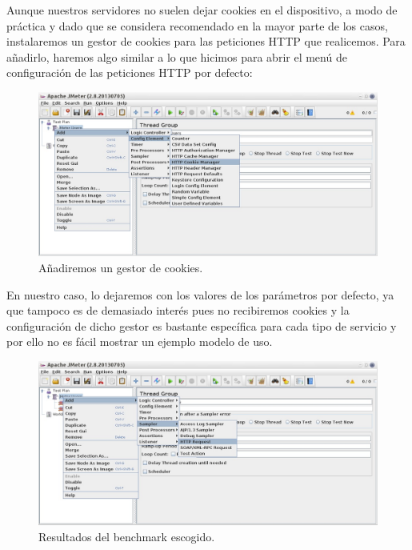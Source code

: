\documentclass[paper=a4, fontsize=11pt]{scrartcl} %
\numberwithin{equation}{section} %
\numberwithin{figure}{section} %
\numberwithin{table}{section} %
\begin{document}
\begin{enumerate}
		Aunque nuestros servidores no suelen dejar cookies en el dispositivo, a modo de práctica y dado
		que se considera recomendado en la mayor parte de los casos, instalaremos un gestor de cookies
		para las peticiones HTTP que realicemos. Para añadirlo, haremos algo similar a lo que hicimos
		para abrir el menú de configuración de las peticiones HTTP por defecto:
		
		\begin{figure}[H]
			\centering
			\includegraphics[width=15cm]{Ejercicio_7e.jpg}
			\caption{Añadiremos un gestor de cookies.}
			\label{fig:cookie}
		\end{figure}
		
		En nuestro caso, lo dejaremos con los valores de los parámetros por defecto, ya que tampoco es
		de demasiado interés pues no recibiremos cookies y la configuración de dicho gestor es bastante
		específica para cada tipo de servicio y por ello no es fácil mostrar un ejemplo modelo de uso.
		
		
		
		\begin{figure}[H]
			\centering
			\includegraphics[width=15cm]{Ejercicio_7f.jpg}
			\caption{Resultados del benchmark escogido.}
			\label{fig:phoroi}
		\end{figure}
		

\end{enumerate}
\end{document}
